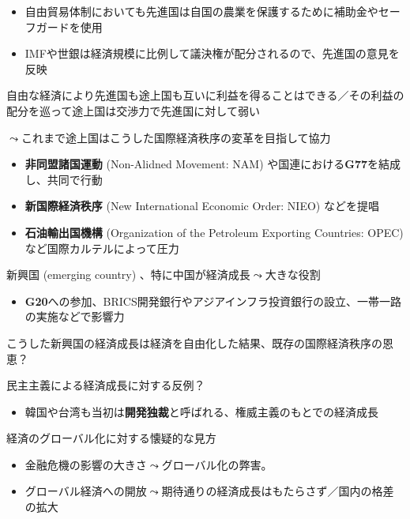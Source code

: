 \documentclass[
  xelatex,
  ja=standard]{bxjsarticle}
\providecommand{\tightlist}{%
  \setlength{\itemsep}{0pt}\setlength{\parskip}{0pt}}\usepackage{longtable,booktabs,array}
\begin{document}
\begin{itemize}
\tightlist
\item
  自由貿易体制においても先進国は自国の農業を保護するために補助金やセーフガードを使用
\item
  IMFや世銀は経済規模に比例して議決権が配分されるので、先進国の意見を反映
\end{itemize}

自由な経済により先進国も途上国も互いに利益を得ることはできる／その利益の配分を巡って途上国は交渉力で先進国に対して弱い

\(\leadsto\)これまで途上国はこうした国際経済秩序の変革を目指して協力

\begin{itemize}
\tightlist
\item
  \textbf{非同盟諸国運動} (Non-Alidned Movement: NAM)
  や国連における\textbf{G77}を結成し、共同で行動
\item
  \textbf{新国際経済秩序} (New International Economic Order: NIEO)
  などを提唱
\item
  \textbf{石油輸出国機構} (Organization of the Petroleum Exporting
  Countries: OPEC) など国際カルテルによって圧力
\end{itemize}

新興国 (emerging country) 、特に中国が経済成長\(\leadsto\)大きな役割

\begin{itemize}
\tightlist
\item
  \textbf{G20}への参加、BRICS開発銀行やアジアインフラ投資銀行の設立、一帯一路の実施などで影響力
\end{itemize}

こうした新興国の経済成長は経済を自由化した結果、既存の国際経済秩序の恩恵？

民主主義による経済成長に対する反例？

\begin{itemize}
\tightlist
\item
  韓国や台湾も当初は\textbf{開発独裁}と呼ばれる、権威主義のもとでの経済成長
\end{itemize}

経済のグローバル化に対する懐疑的な見方

\begin{itemize}
\tightlist
\item
  金融危機の影響の大きさ\(\leadsto\)グローバル化の弊害。
\item
  グローバル経済への開放\(\leadsto\)期待通りの経済成長はもたらさず／国内の格差の拡大
\end{itemize}
\end{document}
